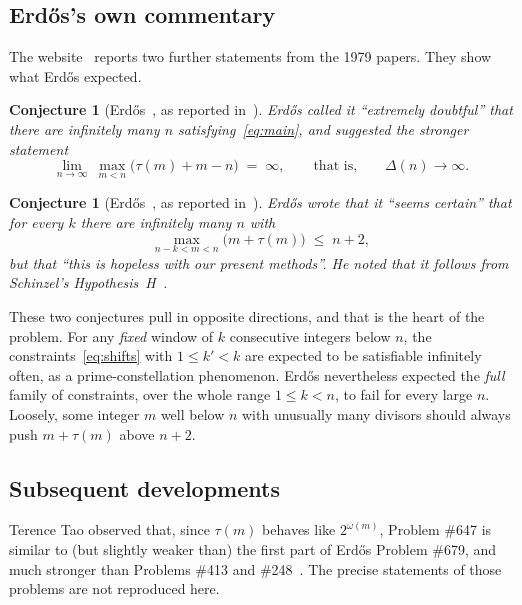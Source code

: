 \documentclass[11pt]{amsart}
\theoremstyle{plain}
\newtheorem{conjecture}[theorem]{Conjecture}
\theoremstyle{definition}
\theoremstyle{remark}
\numberwithin{equation}{section}
\newcommand{\Dl}{\Delta}        %
\begin{document}
\subsection{Erd\H{o}s's own commentary}
The website~\cite{Bloom647} reports two further statements from the 1979 papers. They show what Erd\H{o}s expected.

\begin{conjecture}[Erd\H{o}s~\cite{Erdos1979MathMag}, as reported in~\cite{Bloom647}]\label{conj:infty}
Erd\H{o}s called it ``extremely doubtful'' that there are infinitely many $n$ satisfying~\eqref{eq:main}, and suggested the stronger statement
\begin{equation}\label{eq:delta-infty}
  \lim_{n\to\infty}\ \max_{m<n}\bigl(\tau(m)+m-n\bigr)\;=\;\infty,
  \qquad\text{that is,}\qquad \Dl(n)\to\infty.
\end{equation}
\end{conjecture}

\begin{conjecture}[Erd\H{o}s~\cite{Erdos1979Acta}, as reported in~\cite{Bloom647}]\label{conj:window}
Erd\H{o}s wrote that it ``seems certain'' that for every $k$ there are infinitely many $n$ with
\begin{equation}\label{eq:window}
  \max_{n-k<m<n}\bigl(m+\tau(m)\bigr)\;\le\; n+2,
\end{equation}
but that ``this is hopeless with our present methods''. He noted that it follows from Schinzel's Hypothesis~H~\cite{SchinzelSierpinski1958}.
\end{conjecture}

These two conjectures pull in opposite directions, and that is the heart of the problem. For any \emph{fixed} window of $k$ consecutive integers below $n$, the constraints~\eqref{eq:shifts} with $1\le k'<k$ are expected to be satisfiable infinitely often, as a prime-constellation phenomenon. Erd\H{o}s nevertheless expected the \emph{full} family of constraints, over the whole range $1\le k<n$, to fail for every large $n$. Loosely, some integer $m$ well below $n$ with unusually many divisors should always push $m+\tau(m)$ above $n+2$.

\subsection{Subsequent developments}
Terence Tao observed that, since $\tau(m)$ behaves like $2^{\omega(m)}$, Problem \#647 is similar to (but slightly weaker than) the first part of Erd\H{o}s Problem \#679, and much stronger than Problems \#413 and \#248~\cite{Bloom647,Forum647}. The precise statements of those problems are not reproduced here.
\end{document}
